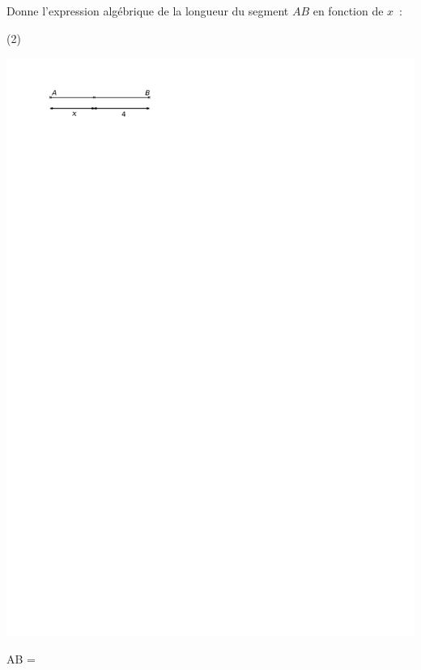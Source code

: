 \documentclass[a4paper,11pt]{report}
\begin{document}
\begin{exop}{ Donne l'expression algébrique de la longueur du segment $AB$ en fonction de $x$~:

\begin{tasks}(2)
    \task 
    
    \includegraphics[scale=1.2
    ]{media/fa-10/ligne1.pdf}

AB = \hrulefill
  \task 
  

\end{tasks}}
\end{exop}
\end{document}
